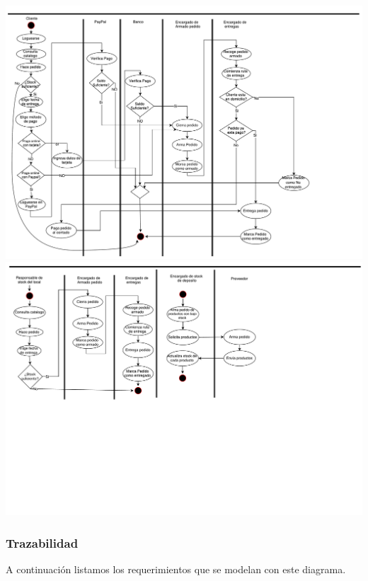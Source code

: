 \includegraphics[scale=0.5, angle=90]{secciones/diagramaActividad1}
\newpage
\newpage
\includegraphics[scale=0.5, angle=90]{secciones/diagramaActividad2}

\newpage

\subsubsection{Trazabilidad}
A continuación listamos los requerimientos que se modelan con este diagrama.

